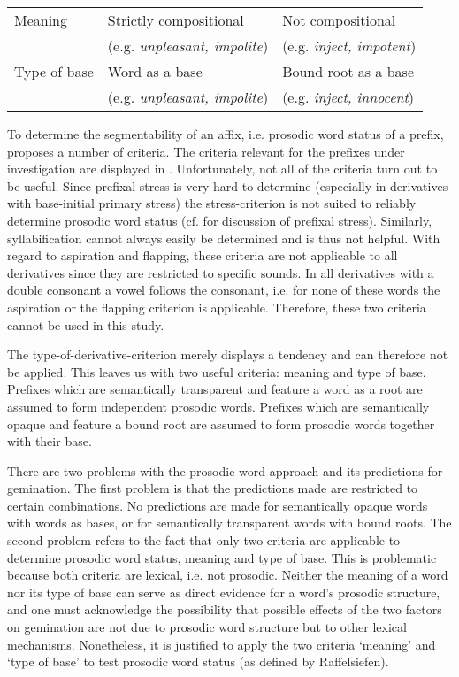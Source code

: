 \begin{table*}
\begin{tabular}{lll}
			Meaning & Strictly compositional & Not compositional\\
							& (e.g. \textit{unpleasant, impolite}) & (e.g. \textit{inject, impotent})
			\\  
			
			Type of base & Word as a base & Bound root as a base\\
										& (e.g. \textit{unpleasant, impolite}) & (e.g. \textit{inject, innocent})
			\\ 
			

						\midrule
		\end{tabular}
\end{table*}

To determine the segmentability of an affix, i.e. prosodic word status of a prefix, \cite{Raffelsiefen.1999} proposes a number of criteria. The criteria relevant for the prefixes under investigation are displayed in . Unfortunately, not all of the criteria turn out to be useful. Since prefixal stress is very hard to determine (especially in derivatives with base-initial primary stress) the stress-criterion is not suited to reliably determine prosodic word status (cf.  for discussion of prefixal stress). Similarly, syllabification cannot always easily be determined and is thus not helpful. 
With regard to aspiration and flapping, these criteria are not applicable to all derivatives since they are restricted to specific sounds. In all derivatives with a double consonant a vowel follows the consonant, i.e. for none of these words the aspiration or the flapping criterion is applicable. Therefore, these two criteria cannot be used in this study.

The type-of-derivative-criterion merely displays a tendency and can therefore not be applied. 
This leaves us with two useful criteria: meaning and type of base. Prefixes which are semantically transparent and feature a word as a root are assumed to form independent prosodic words. Prefixes which are semantically opaque and feature a bound root are assumed to form prosodic words together with their base. 

There are two problems with the prosodic word approach and its predictions for gemination. 
The first problem is that the predictions made are restricted to certain combinations. No predictions are made for semantically opaque words with words as bases, or for semantically transparent words with bound roots. 
The second problem refers to the fact that only two criteria are applicable to determine prosodic word status, meaning and type of base. This is problematic because both criteria are lexical, i.e. not prosodic. Neither the meaning of a word nor its type of base can serve as direct evidence for a word's prosodic structure, and one must acknowledge the possibility that possible effects of the two factors on gemination are not due to prosodic word structure but to other lexical mechanisms. 
Nonetheless, it is justified to apply the two criteria `meaning' and `type of base' to test prosodic word status (as defined by Raffelsiefen). 

